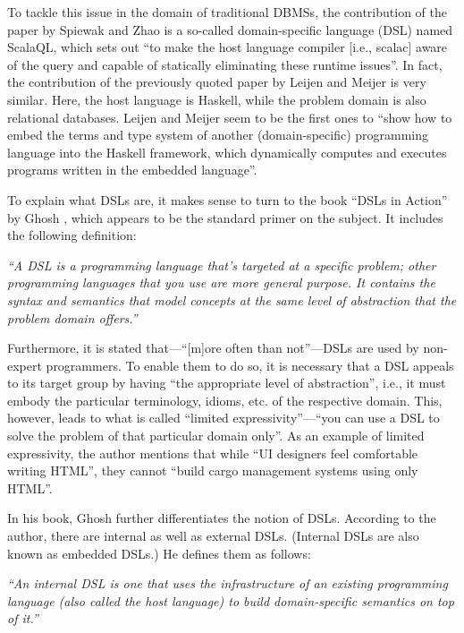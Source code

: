 \documentclass[article, 10pt, type=bsc, colorback, accentcolor=tud8b, parskip=half, bibliography=totocnumbered]{tudthesis}
\begin{document}
To tackle this issue in the domain of traditional DBMSs, the contribution of the paper by Spiewak and Zhao \cite{Spiewak:2009:SLD:2127907.2127923} is a so-called domain-specific language (DSL) named ScalaQL, which sets out ``to make the host language compiler [i.e., scalac] aware of the query and capable of statically eliminating these runtime issues''.
In fact, the contribution of the previously quoted paper by Leijen and Meijer \cite{Leijen:1999:DSE:331960.331977} is very similar.
Here, the host language is Haskell, while the problem domain is also relational databases.
Leijen and Meijer seem to be the first ones to ``show how to embed the terms and type system of another (domain-specific) programming language into the Haskell framework, which dynamically computes and executes programs written in the embedded language''.

To explain what DSLs are, it makes sense to turn to the book ``DSLs in Action'' by Ghosh \cite{Ghosh:2010:DA:1965333}, which appears to be the standard primer on the subject.
It includes the following definition:

\emph{
``A DSL is a programming language that's targeted at a specific problem; other programming languages that you use are more general purpose.
It contains the syntax and semantics that model concepts at the same level of abstraction that the problem domain offers.''}

Furthermore, it is stated that---``[m]ore often than not''---DSLs are used by non-expert programmers.
To enable them to do so, it is necessary that a DSL appeals to its target group by having ``the appropriate level of abstraction'', i.e., it must embody the particular terminology, idioms, etc. of the respective domain.
This, however, leads to what is called ``limited expressivity''---``you can use a DSL to solve the problem of that particular domain only''.
As an example of limited expressivity, the author mentions that while ``UI designers feel comfortable writing HTML'', they cannot ``build cargo management systems using only HTML''.

In his book, Ghosh \cite{Ghosh:2010:DA:1965333} further differentiates the notion of DSLs.
According to the author, there are internal as well as external DSLs.
(Internal DSLs are also known as embedded DSLs.)
He defines them as follows:

\emph{``An internal DSL is one that uses the infrastructure of an existing programming language (also called the host language) to build domain-specific semantics on top of it.''}
\end{document}
